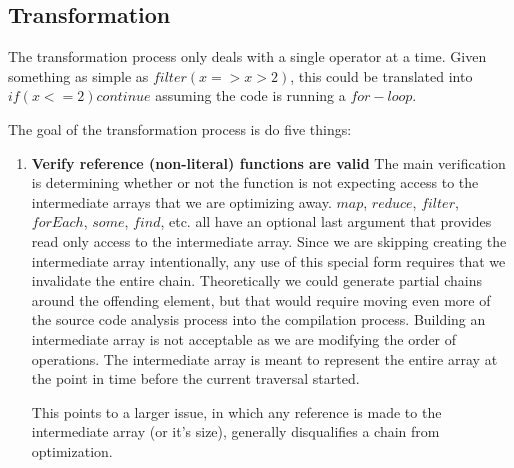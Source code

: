\subsection{Transformation}\label{Transformation}

The transformation process only deals with a single operator at a time.  Given something as simple as $filter(x => x > 2)$, this could be translated into $if (x <= 2) continue$ assuming the code is running a $for-loop$.

The goal of the transformation process is do five things:
\begin{enumerate}
  \item \textbf{Verify reference (non-literal) functions are valid}
    The main verification is determining whether or not the function is not expecting access to the intermediate arrays that we are optimizing away.  $map$, $reduce$, $filter$, $forEach$, $some$, $find$, etc.  all have an optional last argument that provides read only access to the intermediate array.  Since we are skipping creating the intermediate array intentionally, any use of this special form requires that we invalidate the entire chain. Theoretically we could generate partial chains around the offending element, but that would require moving even more of the source code analysis process into the compilation process.  Building an intermediate array is not acceptable as we are modifying the order of operations.  The intermediate array is meant to represent the entire array at the point in time before the current traversal started.  

    This points to a larger issue, in which any reference is made to the intermediate array (or it's size), generally disqualifies a chain from optimization.
  

\end{enumerate}
